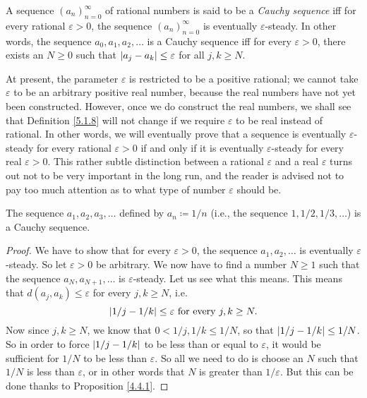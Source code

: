 \setcounter{theorem}{7}
\begin{definition}\label{5.1.8}
A sequence \((a_n)_{n = 0}^{\infty}\) of rational numbers is said to be a \emph{Cauchy sequence} iff for every rational \(\varepsilon > 0\), the sequence \((a_n)_{n = 0}^{\infty}\) is eventually \(\varepsilon\)-steady.
In other words, the sequence \(a_0, a_1, a_2, \dots\) is a Cauchy sequence iff for every \(\varepsilon > 0\), there exists an \(N \geq 0\) such that \(\abs*{a_j - a_k} \leq \varepsilon\) for all \(j, k \geq N\).
\end{definition}

\begin{remark}\label{5.1.9}
At present, the parameter \(\varepsilon\) is restricted to be a positive rational;
we cannot take \(\varepsilon\) to be an arbitrary positive real number, because the real numbers have not yet been constructed.
However, once we do construct the real numbers, we shall see that Definition \ref{5.1.8} will not change if we require \(\varepsilon\) to be real instead of rational.
In other words, we will eventually prove that a sequence is eventually \(\varepsilon\)-steady for every rational \(\varepsilon > 0\) if and only if it is eventually \(\varepsilon\)-steady for every real \(\varepsilon > 0\).
This rather subtle distinction between a rational \(\varepsilon\) and a real \(\varepsilon\) turns out not to be very important in the long run, and the reader is advised not to pay too much attention as to what type of number \(\varepsilon\) should be.
\end{remark}

\setcounter{theorem}{10}
\begin{proposition}\label{5.1.11}
The sequence \(a_1, a_2, a_3, \dots\) defined by \(a_n \coloneqq 1 / n\) (i.e., the sequence \(1, 1 / 2, 1 / 3, \dots\)) is a Cauchy sequence.
\end{proposition}

\begin{proof}
We have to show that for every \(\varepsilon > 0\), the sequence \(a_1, a_2, \dots\) is eventually \(\varepsilon\)-steady.
So let \(\varepsilon > 0\) be arbitrary.
We now have to find a number \(N \geq 1\) such that the sequence \(a_N, a_{N + 1}, \dots\) is \(\varepsilon\)-steady.
Let us see what this means.
This means that \(d(a_j, a_k) \leq \varepsilon\) for every \(j, k \geq N\), i.e.
\[
    \abs*{1 / j - 1 / k} \leq \varepsilon \text{ for every } j, k \geq N.
\]
Now since \(j, k \geq N\), we know that \(0 < 1 / j, 1 / k \leq 1 / N\), so that \(\abs*{1 / j - 1 / k} \leq 1 / N\).
So in order to force \(\abs*{1 / j - 1 / k}\) to be less than or equal to \(\varepsilon\), it would be sufficient for \(1 / N\) to be less than \(\varepsilon\).
So all we need to do is choose an \(N\) such that \(1 / N\) is less than \(\varepsilon\), or in other words that \(N\) is greater than \(1 / \varepsilon\).
But this can be done thanks to Proposition \ref{4.4.1}.
\end{proof}

